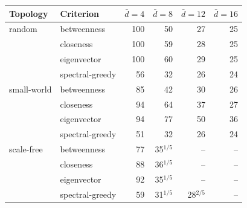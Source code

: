 \begin{tabular}{llrrrr}
\toprule
Topology & Criterion & $\bar d=4$ & $\bar d=8$ & $\bar d=12$ & $\bar d=16$ \\
\midrule
random & betweenness & 100 & 50 & 27 & 25 \\
 & closeness & 100 & 59 & 28 & 25 \\
 & eigenvector & 100 & 60 & 29 & 25 \\
 & spectral-greedy & 56 & 32 & 26 & 24 \\
\addlinespace
small-world & betweenness & 85 & 42 & 30 & 26 \\
 & closeness & 94 & 64 & 37 & 27 \\
 & eigenvector & 94 & 77 & 50 & 36 \\
 & spectral-greedy & 51 & 32 & 26 & 24 \\
\addlinespace
scale-free & betweenness & 77 & 35$^{1/5}$ & -- & -- \\
 & closeness & 88 & 36$^{1/5}$ & -- & -- \\
 & eigenvector & 92 & 35$^{1/5}$ & -- & -- \\
 & spectral-greedy & 59 & 31$^{1/5}$ & 28$^{2/5}$ & -- \\
\bottomrule
\end{tabular}
